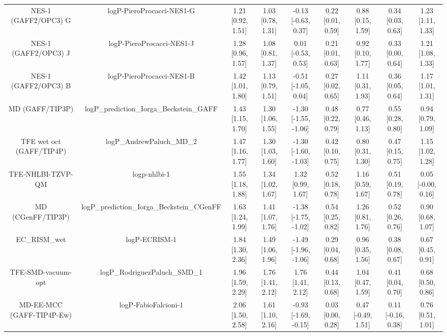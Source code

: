 \documentclass{article}
\begin{document}
\begin{center}
\begin{longtable}{|ccccccccc|}
         NES-1 (GAFF2/OPC3) G &                      logP-PieroProcacci-NES1-G &  1.21 [0.92, 1.51] &  1.03 [0.78, 1.31] &   -0.13 [-0.63, 0.37] &  0.22 [0.01, 0.59] &     0.88 [0.15, 1.59] &     0.34 [0.03, 0.63] &     1.23 [1.11, 1.33] \\
         NES-1 (GAFF2/OPC3) J &                      logP-PieroProcacci-NES1-J &  1.28 [0.96, 1.57] &  1.08 [0.81, 1.37] &    0.01 [-0.53, 0.53] &  0.21 [0.01, 0.63] &     0.92 [0.10, 1.77] &     0.33 [0.00, 0.64] &     1.21 [1.08, 1.33] \\
         NES-1 (GAFF2/OPC3) B &                      logP-PieroProcacci-NES1-B &  1.42 [1.01, 1.80] &  1.13 [0.79, 1.51] &   -0.51 [-1.05, 0.04] &  0.27 [0.02, 0.65] &     1.11 [0.31, 1.93] &     0.36 [0.05, 0.64] &     1.17 [1.01, 1.31] \\
              MD (GAFF/TIP3P) &       logP\_prediction\_Iorga\_Beckstein\_GAFF &  1.43 [1.15, 1.70] &  1.30 [1.06, 1.55] &  -1.30 [-1.55, -1.06] &  0.48 [0.22, 0.79] &     0.77 [0.46, 1.13] &     0.55 [0.28, 0.80] &     0.94 [0.79, 1.09] \\
     TFE wet oct (GAFF/TIP4P) &                      logP\_AndrewPaluch\_MD\_2 &  1.47 [1.16, 1.77] &  1.30 [1.03, 1.60] &  -1.30 [-1.60, -1.03] &  0.42 [0.10, 0.75] &     0.80 [0.31, 1.30] &     0.47 [0.15, 0.75] &     1.15 [1.02, 1.28] \\
            TFE-NHLBI-TZVP-QM &                                   logp-nhlbi-1 &  1.55 [1.18, 1.88] &  1.34 [1.02, 1.67] &     1.32 [0.99, 1.67] &  0.52 [0.18, 0.78] &     1.16 [0.59, 1.67] &     0.51 [0.19, 0.78] &    0.05 [-0.00, 0.16] \\
            MD (CGenFF/TIP3P) &     logP\_prediction\_Iorga\_Beckstein\_CGenFF &  1.63 [1.24, 1.99] &  1.41 [1.07, 1.76] &  -1.38 [-1.75, -1.02] &  0.54 [0.25, 0.82] &     1.26 [0.81, 1.76] &     0.52 [0.26, 0.76] &     0.90 [0.68, 1.07] \\
                  EC_RISM_wet &                                  logP-ECRISM-1 &  1.84 [1.30, 2.36] &  1.49 [1.06, 1.96] &  -1.49 [-1.96, -1.06] &  0.29 [0.04, 0.68] &     0.96 [0.35, 1.56] &     0.38 [0.08, 0.67] &     0.67 [0.45, 0.91] \\
           TFE-SMD-vacuum-opt &                  logP\_RodriguezPaluch\_SMD\_1 &  1.96 [1.59, 2.29] &  1.76 [1.41, 2.12] &     1.76 [1.41, 2.12] &  0.44 [0.13, 0.68] &     1.04 [0.47, 1.59] &     0.41 [0.04, 0.70] &     0.68 [0.50, 0.86] \\
    MD-EE-MCC (GAFF-TIP4P-Ew) &                           logP-FabioFalcioni-1 &  2.06 [1.50, 2.58] &  1.61 [1.10, 2.16] &  -0.93 [-1.69, -0.15] &  0.03 [0.00, 0.28] &    0.47 [-0.49, 1.51] &    0.11 [-0.16, 0.38] &     0.76 [0.51, 1.01] \\

\end{longtable}
\end{center}
\end{document}
